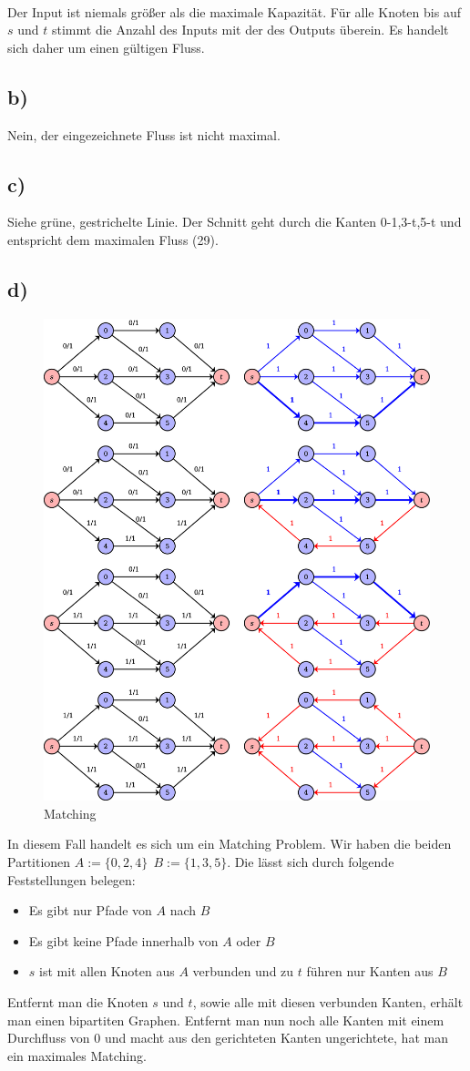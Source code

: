 \documentclass[a4paper,11pt,twoside]{scrartcl}
\begin{document}
$ $\\

Der Input ist niemals größer als die maximale Kapazität. Für alle Knoten bis auf $s$ und $t$ stimmt die Anzahl des Inputs mit der des Outputs  überein. Es handelt sich daher um einen gültigen Fluss.
\subsection*{b)}
Nein, der eingezeichnete Fluss ist nicht maximal.
\subsection*{c)}
Siehe grüne, gestrichelte Linie. Der Schnitt geht durch die Kanten 0-1,3-t,5-t und entspricht dem maximalen Fluss (29).

\pagebreak

\subsection*{d)}

\begin{figure}[H]
	\centering
	\includegraphics[width=0.75\linewidth]{Grafik/Diagramm2}
	\caption{Matching}
	\label{fig:Matching}
\end{figure}
In diesem Fall handelt es sich um ein Matching Problem. Wir haben die beiden Partitionen $A:=\{0,2,4\}~~B:=\{1,3,5\}$. Die lässt sich durch folgende Feststellungen belegen:
\begin{itemize}
	\item Es gibt nur Pfade von $A$ nach $B$
	\item Es gibt keine Pfade innerhalb von $A$ oder $B$
	\item $s$ ist mit allen Knoten aus $A$ verbunden und zu $t$ führen nur Kanten aus $B$
\end{itemize}
Entfernt man die Knoten $s$ und $t$, sowie alle mit diesen verbunden Kanten, erhält man einen bipartiten Graphen. Entfernt man nun noch alle Kanten mit einem Durchfluss von $0$ und macht aus den gerichteten Kanten ungerichtete, hat man ein maximales Matching.
\end{document}

